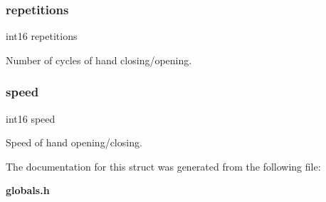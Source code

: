 \subsubsection{repetitions}
{\footnotesize\ttfamily int16 repetitions}

Number of cycles of hand closing/opening. \mbox{\label{structst__calib_a61c8268d27aa01100c1e6eebc6903acc}} 
\subsubsection{speed}
{\footnotesize\ttfamily int16 speed}

Speed of hand opening/closing. 

The documentation for this struct was generated from the following file\+:\begin{DoxyCompactItemize}
\item 
\textbf{ globals.\+h}\end{DoxyCompactItemize}
